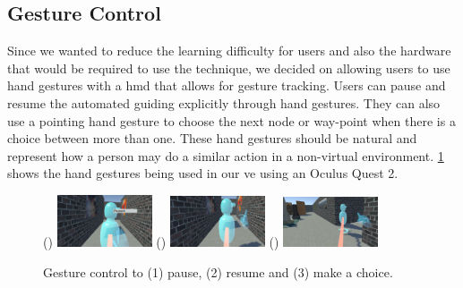 \subsection{Gesture Control}
\label{subsection AGJ AJ: Gesture Control}
Since we wanted to reduce the learning difficulty for users and also the hardware that would be required to use the technique, we decided on allowing users to use hand gestures with a \acrshort{hmd} that allows for gesture tracking. Users can pause and resume the automated guiding explicitly through hand gestures. They can also use a pointing hand gesture to choose the next node or way-point when there is a choice between more than one. These hand gestures should be natural and represent how a person may do a similar action in a non-virtual environment. \cref{fig:automated-jumping-gestures} shows the hand gestures being used in our \acrshort{ve} using an Oculus Quest 2.
\begin{figure}[]
	\centering
	() {\includegraphics[width=0.25\textwidth]{images/paused-gesture.pdf}}
	() {\includegraphics[width=0.25\textwidth]{images/resume-gesture.pdf}}
	() {\includegraphics[width=0.25\textwidth]{images/choice-gesture.pdf}} 
	\caption{Gesture control to (1) pause, (2) resume and (3) make a choice.}
	\label{fig:automated-jumping-gestures}
\end{figure} 